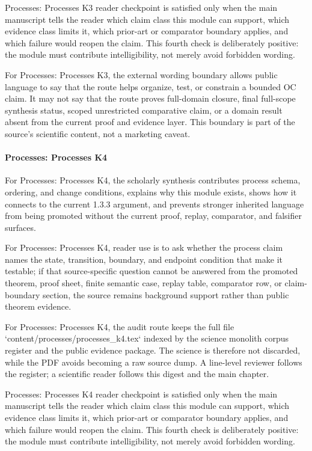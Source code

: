 Processes: Processes K3 reader checkpoint is satisfied only when the main manuscript tells the reader which claim class this module can support, which evidence class limits it, which prior-art or comparator boundary applies, and which failure would reopen the claim. This fourth check is deliberately positive: the module must contribute intelligibility, not merely avoid forbidden wording.


For Processes: Processes K3, the external wording boundary allows public language to say that the route helps organize, test, or constrain a bounded OC claim. It may not say that the route proves full-domain closure, final full-scope synthesis status, scoped unrestricted comparative claim, or a domain result absent from the current proof and evidence layer. This boundary is part of the source's scientific content, not a marketing caveat.


\paragraph{Processes: Processes K4}

For Processes: Processes K4, the scholarly synthesis contributes process schema, ordering, and change conditions, explains why this module exists, shows how it connects to the current 1.3.3 argument, and prevents stronger inherited language from being promoted without the current proof, replay, comparator, and falsifier surfaces.


For Processes: Processes K4, reader use is to ask whether the process claim names the state, transition, boundary, and endpoint condition that make it testable; if that source-specific question cannot be answered from the promoted theorem, proof sheet, finite semantic case, replay table, comparator row, or claim-boundary section, the source remains background support rather than public theorem evidence.


For Processes: Processes K4, the audit route keeps the full file `content/processes/processes\_k4.tex` indexed by the science monolith corpus register and the public evidence package. The science is therefore not discarded, while the PDF avoids becoming a raw source dump. A line-level reviewer follows the register; a scientific reader follows this digest and the main chapter.


Processes: Processes K4 reader checkpoint is satisfied only when the main manuscript tells the reader which claim class this module can support, which evidence class limits it, which prior-art or comparator boundary applies, and which failure would reopen the claim. This fourth check is deliberately positive: the module must contribute intelligibility, not merely avoid forbidden wording.


